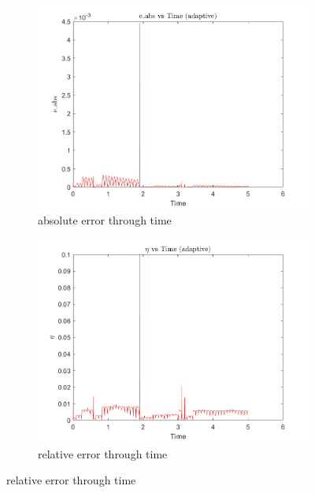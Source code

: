 \documentclass[a4paper,12pt]{article}
\begin{document}
\begin{figure}[h]
  \centering
  \begin{subfigure}[b]{0.5\textwidth}
      \includegraphics[width=\textwidth]{../../Matlab/adaptive_plots/e_abs_vs_time.png}
      \caption{absolute error through time}
      \label{fig:image16}
  \end{subfigure}
  \hspace{-1.0em}%
  \begin{subfigure}[b]{0.5\textwidth}
      \includegraphics[width=\textwidth]{../../Matlab/adaptive_plots/eta_vs_time.png}
      \caption{relative error through time}
      \label{fig:image17}
  \end{subfigure}


\end{figure}
\end{document}
